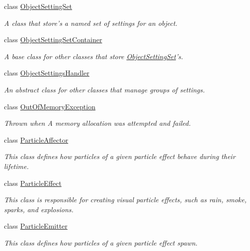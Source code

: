 \begin{DoxyCompactItemize}
class \hyperlink{classMezzanine_1_1ObjectSettingSet}{Object\-Setting\-Set}
\begin{DoxyCompactList}\small\item\em A class that store's a named set of settings for an object. \end{DoxyCompactList}\item 
class \hyperlink{classMezzanine_1_1ObjectSettingSetContainer}{Object\-Setting\-Set\-Container}
\begin{DoxyCompactList}\small\item\em A base class for other classes that store \hyperlink{classMezzanine_1_1ObjectSettingSet}{Object\-Setting\-Set}'s. \end{DoxyCompactList}\item 
class \hyperlink{classMezzanine_1_1ObjectSettingsHandler}{Object\-Settings\-Handler}
\begin{DoxyCompactList}\small\item\em An abstract class for other classes that manage groups of settings. \end{DoxyCompactList}\item 
class \hyperlink{classMezzanine_1_1OutOfMemoryException}{Out\-Of\-Memory\-Exception}
\begin{DoxyCompactList}\small\item\em Thrown when A memory allocation was attempted and failed. \end{DoxyCompactList}\item 
class \hyperlink{classMezzanine_1_1ParticleAffector}{Particle\-Affector}
\begin{DoxyCompactList}\small\item\em This class defines how particles of a given particle effect behave during their lifetime. \end{DoxyCompactList}\item 
class \hyperlink{classMezzanine_1_1ParticleEffect}{Particle\-Effect}
\begin{DoxyCompactList}\small\item\em This class is responsible for creating visual particle effects, such as rain, smoke, sparks, and explosions. \end{DoxyCompactList}\item 
class \hyperlink{classMezzanine_1_1ParticleEmitter}{Particle\-Emitter}
\begin{DoxyCompactList}\small\item\em This class defines how particles of a given particle effect spawn. \end{DoxyCompactList}\item 

\end{DoxyCompactItemize}
